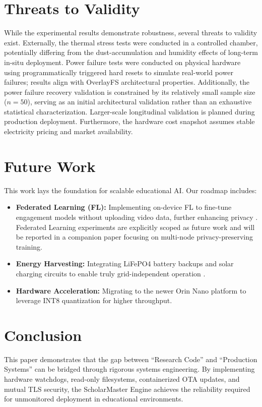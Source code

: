 \documentclass[conference]{IEEEtran}
\begin{document}
\section{Threats to Validity}
While the experimental results demonstrate robustness, several threats to validity exist. Externally, the thermal stress tests were conducted in a controlled chamber, potentially differing from the dust-accumulation and humidity effects of long-term in-situ deployment. Power failure tests were conducted on physical hardware using programmatically triggered hard resets to simulate real-world power failures; results align with OverlayFS architectural properties. Additionally, the power failure recovery validation is constrained by its relatively small sample size ($n=50$), serving as an initial architectural validation rather than an exhaustive statistical characterization. Larger-scale longitudinal validation is planned during production deployment. Furthermore, the hardware cost snapshot assumes stable electricity pricing and market availability.

\section{Future Work}
This work lays the foundation for scalable educational AI. Our roadmap includes:
\begin{itemize}
    \item \textbf{Federated Learning (FL):} Implementing on-device FL to fine-tune engagement models without uploading video data, further enhancing privacy \cite{b26}. Federated Learning experiments are explicitly scoped as future work and will be reported in a companion paper focusing on multi-node privacy-preserving training.
    \item \textbf{Energy Harvesting:} Integrating LiFePO4 battery backups and solar charging circuits to enable truly grid-independent operation \cite{b32}.
    \item \textbf{Hardware Acceleration:} Migrating to the newer Orin Nano platform to leverage INT8 quantization for higher throughput.
\end{itemize}

\section{Conclusion}
This paper demonstrates that the gap between ``Research Code'' and ``Production Systems'' can be bridged through rigorous systems engineering. By implementing hardware watchdogs, read-only filesystems, containerized OTA updates, and mutual TLS security, the ScholarMaster Engine achieves the reliability required for unmonitored deployment in educational environments.
\end{document}
